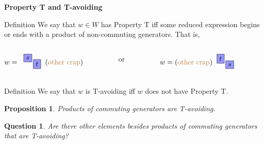\documentclass[9pt,handout]{beamer}
\newtheorem{question}{Question}
\newtheorem{proposition}{Proposition}
\newcommand{\<}{\langle}
\renewcommand{\>}{\rangle}
\begin{document}

\begin{frame}{\textbf{Property T and T-avoiding}}

\begin{block}{Definition}
We say that $w\in W$ has \alert{Property T} iff some reduced expression begins or ends with a product of non-commuting generators. That is,
\begin{columns}
\begin{column}{.4\linewidth}
\begin{center}
$w=\begin{tabular}{c}
\begin{tikzpicture}[scale=.3]
\node[draw, rectangle, fill=blue!40] at (0,5.5){$s$};
\node[draw, rectangle, fill=blue!40] at (1.5,4.5){$t$};
\end{tikzpicture}
\end{tabular}
({\color{brown}\text{other crap}})$
\end{center}
\end{column}

\begin{column}{.1\linewidth}
\begin{center}
or
\end{center}
\end{column}

\begin{column}{.4\linewidth}
\begin{center}
$w=({\color{brown}\text{other crap}})\begin{tabular}{c}
\begin{tikzpicture}[scale=.3]
\node[draw, rectangle, fill=blue!40] at (0,5.5){$t$};
\node[draw, rectangle, fill=blue!40] at (1.5,4.5){$s$};
\end{tikzpicture}
\end{tabular}$
\end{center}
\end{column}
\end{columns}
\end{block}

\pause

\begin{block}{Definition}
We say that $w$ is \alert{T-avoiding} iff $w$ does not have Property T.
\end{block}

\pause

\begin{proposition}
Products of commuting generators are T-avoiding.
\end{proposition}

\pause

\begin{question}
Are there other elements besides products of commuting generators that are T-avoiding?
\end{question}

\end{frame}
\end{document}
